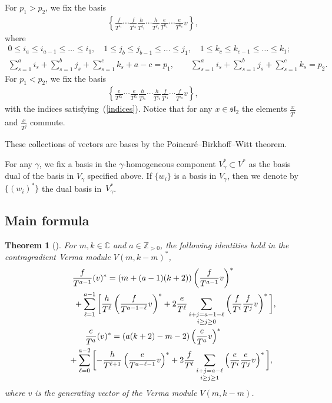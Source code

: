 \documentclass[11pt]{article}
\numberwithin{equation}{section}
\newtheorem{thm}{Theorem}[section]
\begin{document}
For $p_1>p_2$, we fix the basis
\begin{gather*}%
\left\{\frac{f}{T^{i_1}}\cdots \frac{f}{T^{i_a}} \frac{h}{T^{j_1}}\cdots\frac{h}{T^{j_b}} \frac{e}{T^{k_1}}\cdots\frac{e}{T^{k_c}}v \right\},
\end{gather*}
where
\begin{gather}
0\leq i_a\leq i_{a-1}\leq\dots\leq i_1,\quad 1\leq j_b\leq j_{b-1}\leq\dots\leq j_1,\quad 1\leq k_c\leq k_{c-1}\leq\dots\leq k_1; \nonumber\\
\sum_{s=1}^a i_s + \sum_{s=1}^b j_s + \sum_{s=1}^c k_s + a - c = p_1, \qquad \sum_{s=1}^a i_s + \sum_{s=1}^b j_s + \sum_{s=1}^c k_s = p_2.\label{indices}
\end{gather}
For $p_1 < p_2$, we fix the basis
\begin{gather*}%
\left\{\frac{e}{T^{k_1}}\cdots\frac{e}{T^{k_c}} \frac{h}{T^{j_1}}\cdots\frac{h}{T^{j_b}} \frac{f}{T^{i_1}}\cdots\frac{f}{T^{i_a}}v\right\},
\end{gather*}
with the indices satisfying~(\ref{indices}). Notice that for any $x\in\mathfrak{sl}_2$ the elements $\frac x{T^i}$ and $\frac x{T^j}$ commute.

These collections of vectors are bases by the Poincar\'{e}--Birkhoff--Witt theorem.

 For any $\gamma$, we fix a basis in the $\gamma$-homogeneous component $V_\gamma^*\subset V^*$ as the basis dual of the basis in $V_\gamma$ specified above.
If $\{w_i\}$ is a basis in $V_\gamma$, then we denote by $\{(w_i)^*\}$ the dual basis in~$V^*_\gamma$.

\subsection{Main formula}
\begin{thm}[{\cite[Theorem 5.12]{SV2}}]\label{thm form}
For $m, k\in{\mathbb C}$ and $a\in{\mathbb Z}_{>0}$, the following identities hold in the contragradient Verma module $V(m,k-m)^*$,
\begin{gather}
\frac{f}{T^{a-1}} (v)^* = (m+(a-1)(k+2))\left(\frac{f}{T^{a-1}}v\right)^* \nonumber \\
\hphantom{\frac{f}{T^{a-1}} (v)^* =} + \sum_{\ell=1}^{a-1}\bigg[\frac{h}{T^\ell}\left(\frac{f}{T^{a-1-\ell}}v\right)^* + 2 \frac{e}{T^\ell}\mathop{\sum_{i+j=a-1-\ell}}_{i\geq j\geq 0} \left(\frac{f}{T^i}\frac{f}{T^j}v\right)^*\bigg], \label{id A}\\
\frac{e}{T^a} (v)^*=(a(k+2)-m-2) \left(\frac{e}{T^a}v\right)^* \nonumber\\
\hphantom{\frac{e}{T^a} (v)^*=} + \sum_{\ell=0}^{a-2}\bigg[{-} \frac{h}{T^{\ell+1}} \left(\frac{e}{T^{a-\ell-1}}v\right)^* + 2 \frac{f}{T^\ell}\mathop{\sum_{i+j=a-\ell}}_{i\geq j\geq 1} \left(\frac{e}{T^i}\frac{e}{T^j}v\right)^*\bigg],\label{id B}
\end{gather}
where $v$ is the generating vector of the Verma module $V(m,k-m)$.
\end{thm}
\end{document}
